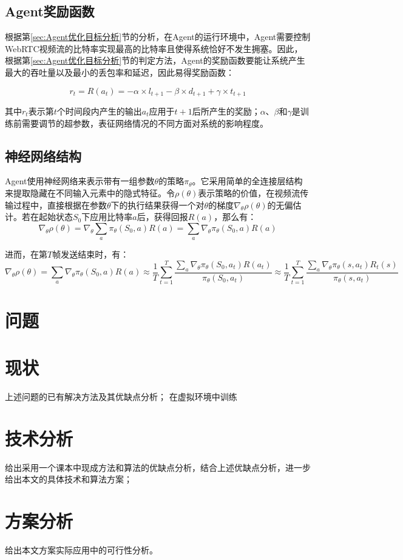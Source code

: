 \documentclass[a4paper]{ctexart}
\begin{document}
\subsection{Agent奖励函数}

根据第\ref{sec:Agent优化目标分析}节的分析，在Agent的运行环境中，Agent需要控制WebRTC视频流的比特率实现最高的比特率且使得系统恰好不发生拥塞。因此，根据第\ref{sec:Agent优化目标分析}节的判定方法，Agent的奖励函数要能让系统产生最大的吞吐量以及最小的丢包率和延迟，因此易得奖励函数：

$$r_t=R(a_t)=-\alpha\times l_{t+1}-\beta\times d_{t+1}+\gamma\times t_{t+1}$$

其中$r_t$表示第$t$个时间段内产生的输出$a_t$应用于$t+1$后所产生的奖励；$\alpha$、$\beta$和$\gamma$是训练前需要调节的超参数，表征网络情况的不同方面对系统的影响程度。

\subsection{神经网络结构}

Agent使用神经网络来表示带有一组参数$\theta$的策略$\pi_\theta$。它采用简单的全连接层结构来提取隐藏在不同输入元素中的隐式特征。令$\rho(\theta)$表示策略的价值，在视频流传输过程中，直接根据在参数$\theta$下的执行结果获得一个对$\theta$的梯度$\nabla_\theta\rho(\theta)$的无偏估计。若在起始状态$S_0$下应用比特率$a$后，获得回报$R(a)$，那么有：
$$\nabla_\theta\rho(\theta)=\nabla_\theta\sum_a\pi_\theta(S_0,a)R(a)=\sum_a\nabla_\theta\pi_\theta(S_0,a)R(a)$$

进而，在第$T$帧发送结束时，有：
$$\nabla_\theta\rho(\theta)=\sum_a\nabla_\theta\pi_\theta(S_0,a)R(a)\approx\frac{1}{T}\sum_{t=1}^T\frac{\sum_a\nabla_\theta\pi_\theta(S_0,a_t)R(a_t)}{\pi_\theta(S_0,a_t)}\approx\frac{1}{T}\sum_{t=1}^T\frac{\sum_a\nabla_\theta\pi_\theta(s,a_t)R_t(s)}{\pi_\theta(s,a_t)}$$

\section{问题}



\section{现状}
上述问题的已有解决方法及其优缺点分析；
在虚拟环境中训练
\section{技术分析}
给出采用一个课本中现成方法和算法的优缺点分析，结合上述优缺点分析，进一步给出本文的具体技术和算法方案；
\section{方案分析}
给出本文方案实际应用中的可行性分析。

\end{document}

